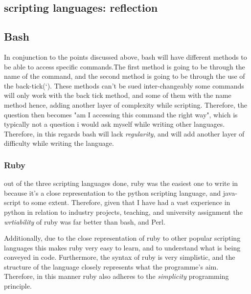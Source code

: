 \documentclass[
	12pt, %
]{fphw}
\begin{document}
\subsection{scripting languages: reflection}

\subsection{Bash} In conjunction to the points discussed above, bash will have different methods to
be able to access specific commands.The first method is going to be through the
name of the command, and the second method is going to be through the use of
the back-tick(`). These methods can't be sued inter-changeably some commands will
only work with the back tick method, and some of them with the name method hence,
adding another layer of complexity  while scripting. Therefore, the question then
becomes "am I accessing this command the right way", which is
typically not a question i would ask myself while writing other languages.
Therefore, in this regards bash will lack \emph{regularity}, and will add another
layer of difficulty while writing the language.\par


\subsubsection{Ruby} out of the three scripting languages done, ruby was the
easiest one to write in because it's a close representation to the python scripting
language, and java-script to some extent. Therefore, given that I have had a
vast experience in python in relation to industry projects, teaching, and
university assignment the \emph{wrtiability} of ruby was far better than bash,
and Perl.\par

Additionally, due to the close representation of ruby to other popular scripting
languages this makes ruby very easy to learn, and to understand what is being
conveyed in code. Furthermore, the syntax of ruby is very simplistic, and the
structure of the language closely represents what the programme's aim.
Therefore, in this manner ruby also adheres to the \emph{simplicity}
programming principle.
\end{document}

